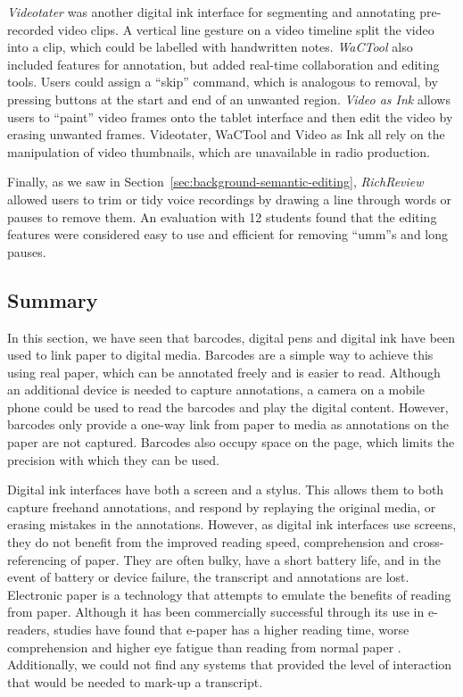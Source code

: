 \textit{Videotater} \citep{Diakopoulos2006} was another digital ink interface for segmenting and annotating
pre-recorded video clips. A vertical line gesture on a video timeline split the video into a clip, which could be
labelled with handwritten notes.  \textit{WaCTool} \citep{Cattelan2008} also included features for annotation, but
added real-time collaboration and editing tools.  Users could assign a ``skip'' command, which is analogous to removal,
by pressing buttons at the start and end of an unwanted region.  \textit{Video as Ink} \citep{Cabral2016} allows users
to ``paint'' video frames onto the tablet interface and then edit the video by erasing unwanted frames.  Videotater,
WaCTool and Video as Ink all rely on the manipulation of video thumbnails, which are unavailable in radio production.




Finally, as we saw in Section~\ref{sec:background-semantic-editing}, \textit{RichReview} \citep{Yoon2014} allowed users
to trim or tidy voice recordings by drawing a line through words or pauses to remove them.  An evaluation with 12
students found that the editing features were considered easy to use and efficient for removing ``umm''s and long
pauses.

\subsection{Summary}
In this section, we have seen that barcodes, digital pens and digital ink have been used to link paper to digital
media.  Barcodes are a simple way to achieve this using real paper, which can be annotated freely and is easier to
read.  Although an additional device is needed to capture annotations, a camera on a mobile phone could be used to read
the barcodes and play the digital content.  However, barcodes only provide a one-way link from paper to media as
annotations on the paper are not captured.  Barcodes also occupy space on the page, which limits the precision with
which they can be used.

Digital ink interfaces have both a screen and a stylus. This allows them to both capture freehand annotations, and
respond by replaying the original media, or erasing mistakes in the annotations.  However, as digital ink interfaces
use screens, they do not benefit from the improved reading speed, comprehension and cross-referencing of paper. They
are often bulky, have a short battery life, and in the event of battery or device failure, the transcript and
annotations are lost.  Electronic paper is a technology that attempts to emulate the benefits of reading from paper.
Although it has been commercially successful through its use in e-readers, studies have found that e-paper has a higher
reading time, worse comprehension and higher eye fatigue than reading from normal paper \citep{Jeong2012, Daniel2013}.
Additionally, we could not find any systems that provided the level of interaction that would be needed to mark-up a
transcript.



